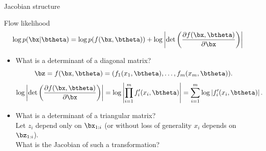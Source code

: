 \begin{frame}{Jacobian structure}

	\begin{block}{Flow likelihood}
		\[
		\log p(\bx|\btheta) = \log p(f(\bx, \btheta)) + \log \left|\det \left( \frac{\partial f(\bx, \btheta)}{\partial \bx} \right) \right|
		\]
	\end{block}
	\begin{itemize}
		\item What is a determinant of a diagonal matrix?
		\[
		\bz = f(\bx, \btheta) = (f_1(x_1, \btheta), \dots, f_m(x_m, \btheta)).
		\]
		\[
		\log \left|\det \left( \frac{\partial f(\bx, \btheta)}{\partial \bx} \right) \right| = \log \left| \prod_{i=1}^m f_i'(x_i, \btheta) \right| = \sum_{i=1}^m \log \left| f_i'(x_i, \btheta) \right|.
		\]
		\item What is a determinant of a triangular matrix? \\
		Let $z_i$ depend only on $\bx_{1:i}$ (or without loss of generality $x_i$ depends on $\bz_{1:i}$). \\
		What is the Jacobian of such a transformation?
	\end{itemize}
\end{frame}
